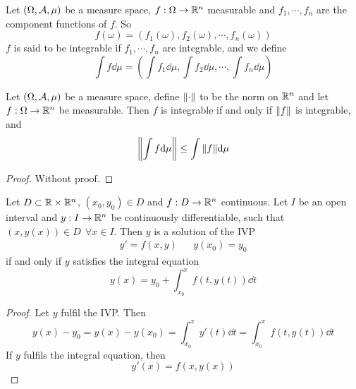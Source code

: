 \documentclass[../../script.tex]{subfiles}
\begin{document}
\begin{defi}
    Let $(\Omega, \mathcal{A}, \mu)$ be a measure space, $f: \Omega \rightarrow \mathbb{R}^n$ measurable and $f_1, \cdots, f_n$ are the component functions of $f$. So 
    \[
        f(\omega) = \left(f_1(\omega), f_2(\omega), \cdots, f_n(\omega)\right)
    \]
    $f$ is said to be integrable if $f_1, \cdots, f_n$ are integrable, and we define
    \[
        \int f \dd\mu = \left(\int f_1 \dd\mu, \int f_2 \dd\mu, \cdots, \int f_n \dd\mu \right)
    \]
\end{defi}

\begin{thm}
    Let $(\Omega, \mathcal{A}, \mu)$ be a measure space, define $\norm{\cdot}$ to be the norm on $\mathbb{R}^n$ and let $f: \Omega \rightarrow \mathbb{R}^n$ be measurable.
    Then $f$ is integrable if and only if $\norm{f}$ is integrable, and 
    \[
        \norm{\int f \dd\mu} \le \int \norm{f} \dd\mu
    \]
\end{thm}
\begin{proof}
    Without proof.
\end{proof}

\begin{lem}\label{lem:picardlem}
    Let $D \subset \mathbb{R} \times \mathbb{R}^n$, $(x_0, y_0) \in D$ and $f: D \rightarrow \mathbb{R}^n$ continuous.
    Let $I$ be an open interval and $y: I \rightarrow \mathbb{R}^n$ be continuously differentiable, such that 
    $(x, y(x)) \in D ~~\forall x \in I$. Then $y$ is a solution of the IVP
    \begin{align*}
        y' = f(x, y) && y(x_0) = y_0
    \end{align*}
    if and only if $y$ satisfies the integral equation 
    \[
        y(x) = y_0 + \int_{x_0}^x f(t, y(t)) \dd{t}
    \]
\end{lem}
\begin{proof}
    Let $y$ fulfil the IVP. Then 
    \[
        y(x) - y_0 = y(x) - y(x_0) = \int_{x_0}^x y'(t) \dd{t} = \int_{x_0}^x f(t, y(t)) \dd{t}
    \]
    If $y$ fulfils the integral equation, then 
    \[
        y'(x) = f(x, y(x))
    \]
\end{proof}
\end{document}
